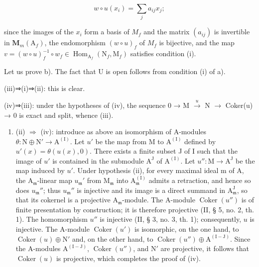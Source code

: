 \[
w \circ u (x _ {i}) = \sum_ {j} a _ {i j} x _ {j};
\]

since the images of the \(x_{i}\) form a basis of \(M_{f}\) and the matrix \((a_{ij})\) is invertible in \(\mathbf{M}_{m}(\mathrm{A}_{f})\), the endomorphism \((w \circ u)_{f}\) of \(M_{f}\) is bijective, and the map \(v = (w \circ u)_{f}^{-1} \circ w_{f} \in \operatorname{Hom}_{\mathrm{A}_{f}}(\mathrm{N}_{f}, \mathrm{M}_{f})\) satisfies condition (i).

Let us prove b). The fact that U is open follows from condition (i) of a).

(iii)⇒(i)⇒(ii): this is clear.

(iv)⇒(iii): under the hypotheses of (iv), the sequence 0 → M \(\xrightarrow{u}\) N \(\longrightarrow\) Coker(u) → 0 is exact and split, whence (iii).

\begin{enumerate}
\def\labelenumi{(\roman{enumi})}
\setcounter{enumi}{1}
\tightlist
\item
  (ii) \(\Rightarrow\) (iv): introduce as above an isomorphism of A-modules \(\theta: \mathrm{N} \oplus \mathrm{N}' \to \mathrm{A}^{(\mathrm{I})}\). Let \(u'\) be the map from M to \(\mathrm{A}^{(\mathrm{I})}\) defined by \(u'(x) = \theta(u(x), 0)\). There exists a finite subset J of I such that the image of \(u'\) is contained in the submodule \(\mathrm{A}^{\mathrm{J}}\) of \(\mathrm{A}^{(\mathrm{I})}\). Let \(u'': \mathrm{M} \to \mathrm{A}^{\mathrm{J}}\) be the map induced by \(u'\). Under hypothesis (ii), for every maximal ideal m of A, the \(\mathrm{A}_{\mathfrak{m}}\)-linear map \(u_{\mathfrak{m}}'\) from \(\mathrm{M}_{\mathfrak{m}}\) into \(\mathrm{A}_{\mathfrak{m}}^{(\mathrm{I})}\) admits a retraction, and hence so does \(u_{\mathfrak{m}}''\); thus \(u_{\mathfrak{m}}''\) is injective and its image is a direct summand in \(\mathrm{A}_{\mathfrak{m}}^{\mathrm{J}}\), so that its cokernel is a projective \(\mathrm{A}_{\mathfrak{m}}\)-module. The A-module \(\operatorname{Coker}(u'')\) is of finite presentation by construction; it is therefore projective (II, § 5, no. 2, th. 1). The homomorphism \(u''\) is injective (II, § 3, no. 3, th. 1); consequently, \(u\) is injective. The A-module \(\operatorname{Coker}(u')\) is isomorphic, on the one hand, to \(\operatorname{Coker}(u) \oplus \mathrm{N}'\) and, on the other hand, to \(\operatorname{Coker}(u'') \oplus \mathrm{A}^{(\mathrm{I}-\mathrm{J})}\). Since the A-modules \(\mathrm{A}^{(\mathrm{I}-\mathrm{J})}\), \(\operatorname{Coker}(u'')\), and \(\mathrm{N}'\) are projective, it follows that \(\operatorname{Coker}(u)\) is projective, which completes the proof of (iv).
\end{enumerate}
\relax{}
